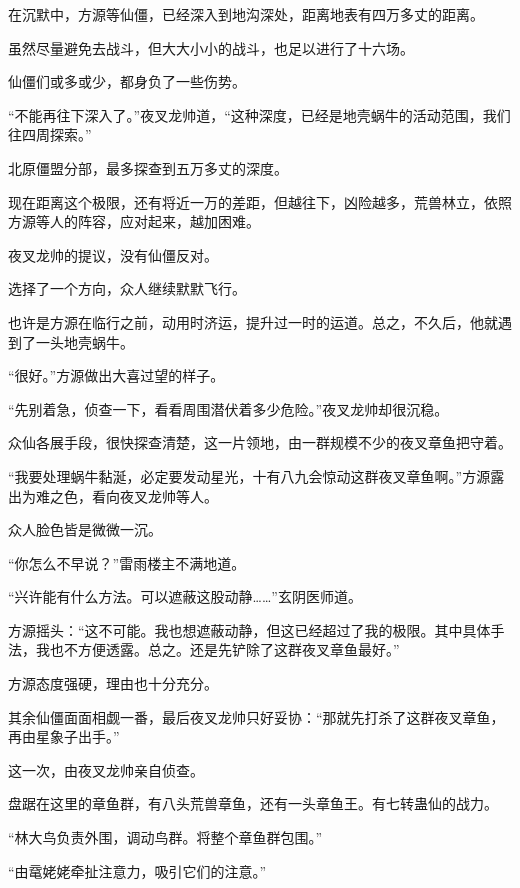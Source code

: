
\begin{this_body}



在沉默中，方源等仙僵，已经深入到地沟深处，距离地表有四万多丈的距离。

虽然尽量避免去战斗，但大大小小的战斗，也足以进行了十六场。

仙僵们或多或少，都身负了一些伤势。

“不能再往下深入了。”夜叉龙帅道，“这种深度，已经是地壳蜗牛的活动范围，我们往四周探索。”

北原僵盟分部，最多探查到五万多丈的深度。

现在距离这个极限，还有将近一万的差距，但越往下，凶险越多，荒兽林立，依照方源等人的阵容，应对起来，越加困难。

夜叉龙帅的提议，没有仙僵反对。

选择了一个方向，众人继续默默飞行。

也许是方源在临行之前，动用时济运，提升过一时的运道。总之，不久后，他就遇到了一头地壳蜗牛。

“很好。”方源做出大喜过望的样子。

“先别着急，侦查一下，看看周围潜伏着多少危险。”夜叉龙帅却很沉稳。

众仙各展手段，很快探查清楚，这一片领地，由一群规模不少的夜叉章鱼把守着。

“我要处理蜗牛黏涎，必定要发动星光，十有八九会惊动这群夜叉章鱼啊。”方源露出为难之色，看向夜叉龙帅等人。

众人脸色皆是微微一沉。

“你怎么不早说？”雷雨楼主不满地道。

“兴许能有什么方法。可以遮蔽这股动静……”玄阴医师道。

方源摇头：“这不可能。我也想遮蔽动静，但这已经超过了我的极限。其中具体手法，我也不方便透露。总之。还是先铲除了这群夜叉章鱼最好。”

方源态度强硬，理由也十分充分。

其余仙僵面面相觑一番，最后夜叉龙帅只好妥协：“那就先打杀了这群夜叉章鱼，再由星象子出手。”

这一次，由夜叉龙帅亲自侦查。

盘踞在这里的章鱼群，有八头荒兽章鱼，还有一头章鱼王。有七转蛊仙的战力。

“林大鸟负责外围，调动鸟群。将整个章鱼群包围。”

“由鼋姥姥牵扯注意力，吸引它们的注意。”


\end{this_body}
